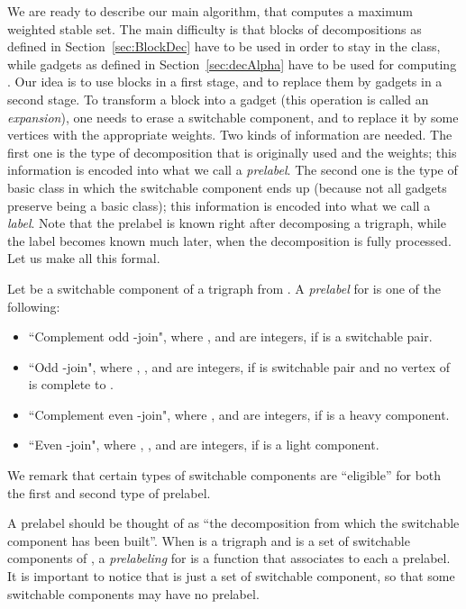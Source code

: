 \documentclass[11 pt] {article}
\begin{document}
We are ready to describe our main algorithm, that computes a maximum
weighted stable set.  The main difficulty is that blocks of
decompositions as defined in Section~\ref{sec:BlockDec} have to be used
in order to stay in the class, while gadgets as defined in
Section~\ref{sec:decAlpha} have to be used for computing .
Our idea is to use blocks in a first stage, and to replace them by
gadgets in a second stage.  To transform a block into a gadget (this
operation is called an \emph{expansion}), one needs to erase a
switchable component, and to replace it by some vertices with the
appropriate weights.  Two kinds of information are needed.  The first
one is the type of decomposition that is originally used and the
weights; this information is encoded into what we call a
\emph{prelabel}.  The second one is the type of basic class in which
the switchable component ends up (because not all gadgets preserve
being a basic class); this information is encoded into what we call a
\emph{label}.  Note that the prelabel is known right after decomposing
a trigraph, while the label becomes known much later, when the
decomposition is fully processed.  Let us make all this formal.

Let  be a switchable component of a trigraph  from .  A
\emph{prelabel} for  is one of the following: 

\begin{itemize}
\item ``Complement odd -join", 
  where ,  and  are integers, if  is
  a switchable pair.

\item  ``Odd -join",  where ,
  ,  and  are integers,
if  is switchable pair and no vertex of  is complete to .

\item  ``Complement even -join",  where
  ,  and  are integers, if  is a heavy 
  component.

\item ``Even -join",
   where ,
  ,  and  are integers, if  is a light 
  component.

\end{itemize} 

We remark that certain types of switchable components are ``eligible''
for both the first and second type of prelabel.

A prelabel should be thought of as ``the decomposition from which the
switchable component has been built''.  When  is a trigraph and
 is a set of switchable components of , a
\emph{prelabeling} for  is a function that associates
to each  a prelabel.  It is important to notice that
 is just a set of switchable component, so that some
switchable components may have no prelabel. 
\end{document}
